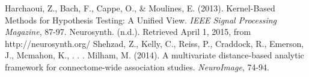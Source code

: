 \documentclass[12pt]{article}
\begin{document}
\pagebreak

\begin{thebibliography}{widest entry}


 Harchaoui, Z., Bach, F., Cappe, O., \& Moulines, E. (2013). Kernel-Based Methods for Hypothesis Testing: A Unified View. \emph{IEEE Signal Processing Magazine}, 87-97.
 Neurosynth. (n.d.). Retrieved April 1, 2015, from http://neurosynth.org/
 Shehzad, Z., Kelly, C., Reiss, P., Craddock, R., Emerson, J., Mcmahon, K., . . . Milham, M. (2014). A multivariate distance-based analytic framework for connectome-wide association studies. \emph{NeuroImage}, 74-94.


\end{thebibliography}
\end{document}
